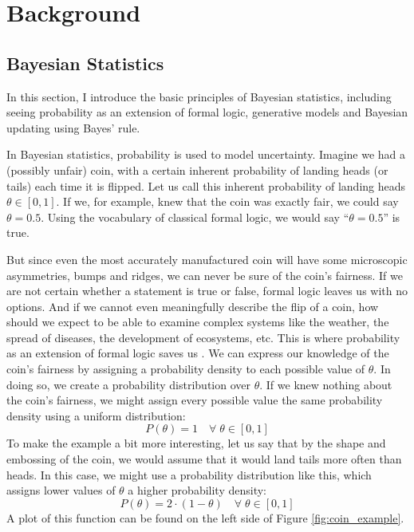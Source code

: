 \documentclass[12pt, a4paper]{report}
\begin{document}
\chapter{Background}
\section{Bayesian Statistics}
In this section, I introduce the basic principles of Bayesian statistics, including seeing probability as an extension of formal logic, generative models and Bayesian updating using Bayes' rule.

In Bayesian statistics, probability is used to model uncertainty.
Imagine we had a (possibly unfair) coin, with a certain inherent probability of landing heads (or tails) each time it is flipped.
Let us call this inherent probability of landing heads $\theta \in [0, 1]$.
If we, for example, knew that the coin was exactly fair, we could say $\theta = 0.5$.
Using the vocabulary of classical formal logic, we would say ``$\theta = 0.5$'' is true.

But since even the most accurately manufactured coin will have some microscopic asymmetries, bumps and ridges, we can never be sure of the coin's fairness.
If we are not certain whether a statement is true or false, formal logic leaves us with no options.
And if we cannot even meaningfully describe the flip of a coin, how should we expect to be able to examine complex systems like the weather, the spread of diseases, the development of ecosystems, etc.
This is where probability as an extension of formal logic saves us \cite[12]{jaynes}.
We can express our knowledge of the coin's fairness by assigning a probability density to each possible value of $\theta$.
In doing so, we create a probability distribution over $\theta$.
If we knew nothing about the coin's fairness, we might assign every possible value the same probability density using a uniform distribution:
$$
    P(\theta) = 1 \quad \forall \; \theta \in [0,1]
$$
To make the example a bit more interesting, let us say that by the shape and embossing of the coin, we would assume that it would land tails more often than heads.
In this case, we might use a probability distribution like this, which assigns lower values of $\theta$ a higher probability density:
$$
    P(\theta) = 2 \cdot (1-\theta) \quad \forall \; \theta \in [0,1]
$$
A plot of this function can be found on the left side of Figure \ref{fig:coin_example}.
\end{document}
